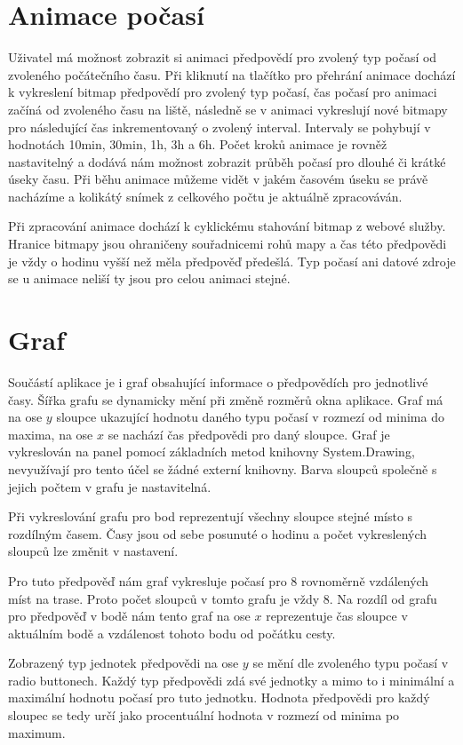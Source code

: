 \documentclass[czech,bachelor,dept460,male,csharp,cpdeclaration]{diploma}
\begin{document}
	\section{Animace počasí}
	
	Uživatel má možnost zobrazit si animaci předpovědí pro zvolený typ počasí od zvoleného počátečního času. Při kliknutí na tlačítko pro přehrání animace dochází k vykreslení bitmap předpovědí pro zvolený typ počasí, čas počasí pro animaci začíná od zvoleného času na liště, následně se v animaci vykreslují nové bitmapy pro následující čas inkrementovaný o zvolený interval. Intervaly se pohybují v hodnotách 10min, 30min, 1h, 3h a 6h. Počet kroků animace je rovněž nastavitelný a dodává nám možnost zobrazit průběh počasí pro dlouhé či krátké úseky času. Při běhu animace můžeme vidět v jakém časovém úseku se právě nacházíme a kolikátý snímek z celkového počtu je aktuálně zpracováván.
	
	Při zpracování animace dochází k cyklickému stahování bitmap z webové služby. Hranice bitmapy jsou ohraničeny souřadnicemi rohů mapy a čas této předpovědi je vždy o hodinu vyšší než měla předpověď předešlá. Typ počasí ani datové zdroje se u animace neliší ty jsou pro celou animaci stejné.
	
	\section{Graf}
	
	Součástí aplikace je i graf obsahující informace o předpovědích pro jednotlivé časy. Šířka grafu se dynamicky mění při změně rozměrů okna aplikace. Graf má na ose $y$ sloupce ukazující hodnotu daného typu počasí v rozmezí od minima do maxima, na ose $x$ se nachází čas předpovědi pro daný sloupce. Graf je vykreslován na panel pomocí základních metod knihovny System.Drawing, nevyužívají pro tento účel se žádné externí knihovny. Barva sloupců společně s jejich počtem v grafu je nastavitelná.
	
	Při vykreslování grafu pro bod reprezentují všechny sloupce stejné místo s rozdílným časem. Časy jsou od sebe posunuté o hodinu a počet vykreslených sloupců lze změnit v nastavení.
	
	Pro tuto předpověď nám graf vykresluje počasí pro 8 rovnoměrně vzdálených míst na trase. Proto počet sloupců v tomto grafu je vždy 8. Na rozdíl od grafu pro předpověď v bodě nám tento graf na ose $x$ reprezentuje čas sloupce v aktuálním bodě a vzdálenost tohoto bodu od počátku cesty.
	
	Zobrazený typ jednotek předpovědi na ose $y$ se mění dle zvoleného typu počasí v radio buttonech. Každý typ předpovědi zdá své jednotky a mimo to i minimální a maximální hodnotu počasí pro tuto jednotku. Hodnota předpovědi pro každý sloupec se tedy určí jako procentuální hodnota v rozmezí od minima po maximum.
	
\end{document}
